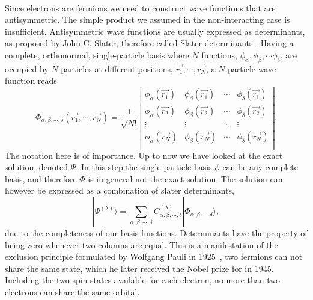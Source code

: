\paragraph*{}
Since electrons are fermions we need to construct wave functions that are antisymmetric.
The simple product we assumed in the non-interacting case is insufficient.
Antisymmetric wave functions are usually expressed as determinants, as proposed by John C. Slater, therefore called Slater determinants \cite{PhysRev.34.1293}.
Having a complete, orthonormal, single-particle basis where $N$ functions,  $\phi_{\alpha}, \phi_{\beta}, \cdots \phi_{\delta}$, are occupied by $N$ particles at different positions, $\vec{r_1}, \cdots , \vec{r_N}$, a $N$-particle wave function reads
\begin{equation}
\label{eq:manybody:slater}
\Phi_{\alpha,\beta,\cdots,\delta}(\vec{r_1},\cdots,\vec{r_N})
=
\frac{1}{\sqrt{N!}}
\left|
\begin{matrix}
\phi_{\alpha}(\vec{r_1}) & \phi_{\beta}(\vec{r_1}) & \cdots & \phi_{\delta}(\vec{r_1}) \\
\phi_{\alpha}(\vec{r_2}) & \phi_{\beta}(\vec{r_2}) & \cdots & \phi_{\delta}(\vec{r_2}) \\
\vdots                   & \vdots                  & \ddots & \vdots \\
\phi_{\alpha}(\vec{r_N}) & \phi_{\beta}(\vec{r_N}) & \cdots & \phi_{\delta}(\vec{r_N})\\
\end{matrix}
\right| .
\end{equation}
The notation here is of importance.
Up to now we have looked at the exact solution, denoted $\Psi$.
In this step the single particle basis $\phi$ can be any complete basis, and therefore $\Phi$ is in general not the exact solution.
The solution can however be expressed as a combination of slater determinants, 
\begin{equation}
|\Psi^{(\lambda)} \rangle = 
\sum_{\alpha,\beta,\cdots,\delta} C_{\alpha,\beta,\cdots,\delta}^{(\lambda)}
|\Phi_{\alpha,\beta,\cdots,\delta} \rangle ,
\end{equation}
due to the completeness of our basis functions.
Determinants have the property of being zero whenever two columns are equal.
This is a manifestation of the exclusion principle formulated by Wolfgang Pauli in 1925~\cite{springerlink:10.1007/BF02980631}, two fermions can not share the same state, which he later received the Nobel prize for in 1945.
Including the two spin states available for each electron, no more than two electrons can share the same orbital.


